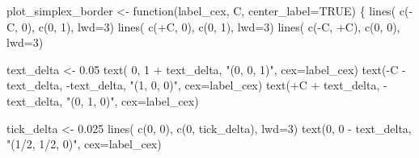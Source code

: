 \documentclass[
  letterpaper,
  DIV=11,
  numbers=noendperiod]{scrartcl}
\newenvironment{Shaded}{\begin{snugshade}}{\end{snugshade}}
\newcommand{\AttributeTok}[1]{\textcolor[rgb]{0.40,0.45,0.13}{#1}}
\newcommand{\ConstantTok}[1]{\textcolor[rgb]{0.56,0.35,0.01}{#1}}
\newcommand{\ControlFlowTok}[1]{\textcolor[rgb]{0.00,0.23,0.31}{#1}}
\newcommand{\DecValTok}[1]{\textcolor[rgb]{0.68,0.00,0.00}{#1}}
\newcommand{\FloatTok}[1]{\textcolor[rgb]{0.68,0.00,0.00}{#1}}
\newcommand{\FunctionTok}[1]{\textcolor[rgb]{0.28,0.35,0.67}{#1}}
\newcommand{\NormalTok}[1]{\textcolor[rgb]{0.00,0.23,0.31}{#1}}
\newcommand{\OtherTok}[1]{\textcolor[rgb]{0.00,0.23,0.31}{#1}}
\newcommand{\SpecialCharTok}[1]{\textcolor[rgb]{0.37,0.37,0.37}{#1}}
\newcommand{\StringTok}[1]{\textcolor[rgb]{0.13,0.47,0.30}{#1}}
\begin{document}
\begin{Shaded}
\begin{Highlighting}[]
\NormalTok{plot\_simplex\_border }\OtherTok{\textless{}{-}} \ControlFlowTok{function}\NormalTok{(label\_cex, C, }\AttributeTok{center\_label=}\ConstantTok{TRUE}\NormalTok{) \{}
  \FunctionTok{lines}\NormalTok{( }\FunctionTok{c}\NormalTok{(}\SpecialCharTok{{-}}\NormalTok{C, }\DecValTok{0}\NormalTok{), }\FunctionTok{c}\NormalTok{(}\DecValTok{0}\NormalTok{, }\DecValTok{1}\NormalTok{), }\AttributeTok{lwd=}\DecValTok{3}\NormalTok{)}
  \FunctionTok{lines}\NormalTok{( }\FunctionTok{c}\NormalTok{(}\SpecialCharTok{+}\NormalTok{C, }\DecValTok{0}\NormalTok{), }\FunctionTok{c}\NormalTok{(}\DecValTok{0}\NormalTok{, }\DecValTok{1}\NormalTok{), }\AttributeTok{lwd=}\DecValTok{3}\NormalTok{)}
  \FunctionTok{lines}\NormalTok{( }\FunctionTok{c}\NormalTok{(}\SpecialCharTok{{-}}\NormalTok{C, }\SpecialCharTok{+}\NormalTok{C), }\FunctionTok{c}\NormalTok{(}\DecValTok{0}\NormalTok{, }\DecValTok{0}\NormalTok{), }\AttributeTok{lwd=}\DecValTok{3}\NormalTok{)}

\NormalTok{  text\_delta }\OtherTok{\textless{}{-}} \FloatTok{0.05}
  \FunctionTok{text}\NormalTok{( }\DecValTok{0}\NormalTok{, }\DecValTok{1} \SpecialCharTok{+}\NormalTok{ text\_delta, }\StringTok{"(0, 0, 1)"}\NormalTok{, }\AttributeTok{cex=}\NormalTok{label\_cex)}
  \FunctionTok{text}\NormalTok{(}\SpecialCharTok{{-}}\NormalTok{C }\SpecialCharTok{{-}}\NormalTok{ text\_delta, }\SpecialCharTok{{-}}\NormalTok{text\_delta, }\StringTok{"(1, 0, 0)"}\NormalTok{, }\AttributeTok{cex=}\NormalTok{label\_cex)}
  \FunctionTok{text}\NormalTok{(}\SpecialCharTok{+}\NormalTok{C }\SpecialCharTok{+}\NormalTok{ text\_delta, }\SpecialCharTok{{-}}\NormalTok{text\_delta, }\StringTok{"(0, 1, 0)"}\NormalTok{, }\AttributeTok{cex=}\NormalTok{label\_cex)}

\NormalTok{  tick\_delta }\OtherTok{\textless{}{-}} \FloatTok{0.025}
  \FunctionTok{lines}\NormalTok{( }\FunctionTok{c}\NormalTok{(}\DecValTok{0}\NormalTok{, }\DecValTok{0}\NormalTok{), }\FunctionTok{c}\NormalTok{(}\DecValTok{0}\NormalTok{, tick\_delta), }\AttributeTok{lwd=}\DecValTok{3}\NormalTok{)}
  \FunctionTok{text}\NormalTok{(}\DecValTok{0}\NormalTok{, }\DecValTok{0} \SpecialCharTok{{-}}\NormalTok{ text\_delta, }\StringTok{"(1/2, 1/2, 0)"}\NormalTok{, }\AttributeTok{cex=}\NormalTok{label\_cex)}


\end{Highlighting}
\end{Shaded}
\end{document}
